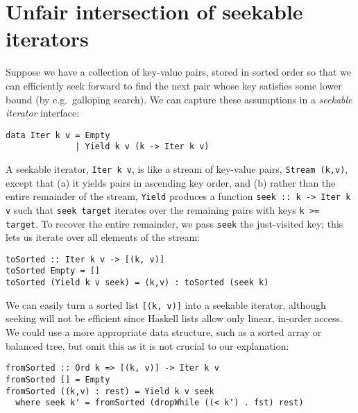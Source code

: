\documentclass[acmsmall,screen,review,anonymous,dvipsnames,svgnames]{acmart}
\newcommand\hask[1]{\texttt{#1}}
\newcommand\ttt\texttt
\newcommand\todo[1]{{\color{Orange}#1}}
\renewcommand\todo[1]{{\color{IndianRed}#1}}
\renewcommand\todo[1]{\ignorespaces}
\begin{document}



\section{Unfair intersection of seekable iterators}
\label{sec:unfair-intersection}

Suppose we have a collection of key-value pairs, stored in sorted order so that we can efficiently seek forward to find the next pair whose key satisfies some lower bound (by e.g.\ galloping search).
We can capture these assumptions in a \emph{seekable iterator} interface:

\begin{verbatim}
data Iter k v = Empty
              | Yield k v (k -> Iter k v)
\end{verbatim}

\noindent
A seekable iterator, \hask{Iter k v}, is like a stream of key-value pairs, \hask{Stream (k,v)}, except that (a) it yields pairs in ascending key order, and (b) rather than the entire remainder of the stream, \hask{Yield} produces a function \hask{seek :: k -> Iter k v}
such that
\ttt{seek target} iterates over the remaining pairs with keys \ttt{k >= target}.
%
To recover the entire remainder, we pass \ttt{seek} the just-visited key; this lets us iterate over all elements of the stream:

\begin{verbatim}
toSorted :: Iter k v -> [(k, v)]
toSorted Empty = []
toSorted (Yield k v seek) = (k,v) : toSorted (seek k)
\end{verbatim}

\noindent
We can easily turn a sorted list \hask{[(k, v)]} into a seekable iterator, although seeking will not be efficient since Haskell lists allow only linear, in-order access.
We could use a more appropriate data structure, such as a sorted array or balanced tree, but omit this as it is not crucial to our explanation:

\begin{verbatim}
fromSorted :: Ord k => [(k, v)] -> Iter k v
fromSorted [] = Empty
fromSorted ((k,v) : rest) = Yield k v seek
  where seek k' = fromSorted (dropWhile ((< k') . fst) rest)
\end{verbatim}
\end{document}
